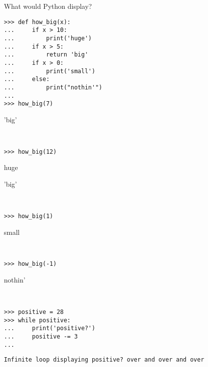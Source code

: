 \question What would Python display?
\begin{lstlisting}
>>> def how_big(x):
...     if x > 10:
...         print('huge')
...     if x > 5:
...         return 'big'
...     if x > 0:
...         print('small')
...     else:
...         print("nothin'")
... 
>>> how_big(7) 
\end{lstlisting} 
\begin{solution}
'big'
\end{solution}
\begin{lstlisting}


>>> how_big(12)
\end{lstlisting} 
\begin{solution}

huge

'big'
\end{solution}
\begin{lstlisting}


>>> how_big(1) 
\end{lstlisting} 
\begin{solution}
small
\end{solution}
\begin{lstlisting}


>>> how_big(-1)
\end{lstlisting}
\begin{solution}
nothin'
\end{solution}
\begin{lstlisting}


>>> positive = 28
>>> while positive:
...     print('positive?')
...     positive -= 3
...
\end{lstlisting}
\begin{solution}
{\tt Infinite loop displaying positive? over and over and over}
\end{solution}

